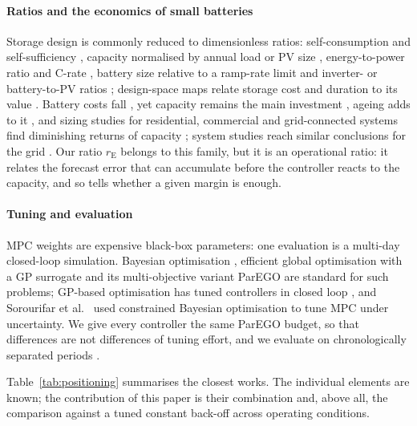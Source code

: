 \documentclass[a4paper,fleqn]{cas-dc}
\newcommand{\rE}{r_{\mathrm{E}}}
\begin{document}
\paragraph{Ratios and the economics of small batteries} Storage design is commonly reduced to dimensionless ratios: self-consumption and self-sufficiency \cite{luthander2015selfconsumption,quoilin2016quantifying,alnaser2021transition}, capacity normalised by annual load or PV size \cite{weniger2014sizing,mason2016energetic}, energy-to-power ratio and C-rate \cite{hesse2017lithium,dowling2020role}, battery size relative to a ramp-rate limit \cite{makibar2017relation} and inverter- or battery-to-PV ratios \cite{diorio2020model}; design-space maps relate storage cost and duration to its value \cite{sepulveda2021design}. Battery costs fall \cite{schmidt2017future,kittner2017energy,schmidt2019projecting,ziegler2021reexamining}, yet capacity remains the main investment \cite{zakeri2015electrical}, ageing adds to it \cite{xu2018factoring,wu2022optimal}, and sizing studies for residential, commercial and grid-connected systems find diminishing returns of capacity \cite{weniger2014sizing,mulleriyawage2020optimally,linssen2017techno,laksahapsoro2025optimisation,secchi2021multi,yang2018bess,zhang2022gridconnected}; system studies reach similar conclusions for the grid \cite{zerrahn2018economics}. Our ratio $\rE$ belongs to this family, but it is an operational ratio: it relates the forecast error that can accumulate before the controller reacts to the capacity, and so tells whether a given margin is enough.

\paragraph{Tuning and evaluation} MPC weights are expensive black-box parameters: one evaluation is a multi-day closed-loop simulation. Bayesian optimisation \cite{shahriari2016taking}, efficient global optimisation with a GP surrogate \cite{jones1998efficient} and its multi-objective variant ParEGO \cite{knowles2006parego} are standard for such problems; GP-based optimisation has tuned controllers in closed loop \cite{marco2016automatic}, and Sorourifar et al.\ \cite{sorourifar2021data} used constrained Bayesian optimisation to tune MPC under uncertainty. We give every controller the same ParEGO budget, so that differences are not differences of tuning effort, and we evaluate on chronologically separated periods \cite{bergmeir2012use,lago2021forecasting}.

Table~\ref{tab:positioning} summarises the closest works. The individual elements are known; the contribution of this paper is their combination and, above all, the comparison against a tuned constant back-off across operating conditions.
\end{document}
